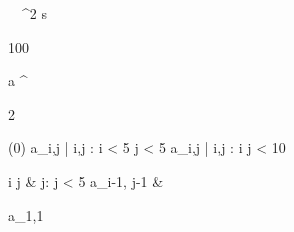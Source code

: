 \begin{eqcode}{\mu}{\ }{\ }{^2}
  s \gets \begin {tmatrix}
  100  \lend
  \end{tmatrix} \lend
   \lend
  a \gets \genar \limits ^{\begin{tmatrix} 2  \lend \end{tmatrix}} (0) \lend
   \lend
  a_{i,j} | i,j : i < 5 \cap j < 5  \lend
   \lend
  a_{i,j} | i,j : i  \cap j < 10 \gets
  \begin{cases}
    i \cdot j & j: j < 5 \lend
    a_{i-1, j-1} & \otherwise \lend
  \end{cases} \lend
   \lend
  a_{1,1}  \lend
   \lend
   \lend
\end{eqcode}

